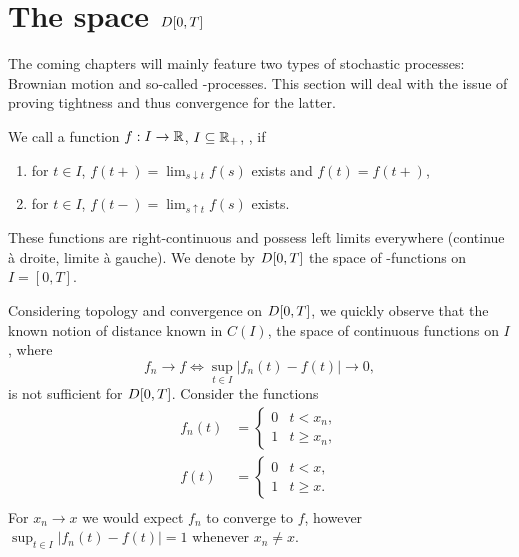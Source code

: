 \section{The space $D[0, T]$} \label{S: space DT}

The coming chapters will mainly feature two types of stochastic processes:
Brownian motion and so-called \cadlag-processes.
This section will deal with the issue of proving tightness and thus convergence for the latter.

\begin{definition} \label{D: DT}
	We call a function $f: I \rightarrow \mathbb{R}$, $I \subseteq \mathbb{R}_+$, \emph{\cadlag},
	if
	\begin{enumerate}
		\item for $t \in I$, $f(t+) = \lim_{s \downarrow t}f(s)$ exists and $f(t) = f(t+)$,
		\item for $t \in I$, $f(t-) = \lim_{s \uparrow t}f(s)$ exists.
	\end{enumerate}
	These functions are right-continuous and possess left limits everywhere (continue à droite, limite à gauche).
	We denote by $D[0, T]$ the space of \cadlag-functions on $I = [0,T]$.
\end{definition}

Considering topology and convergence on $D[0, T]$, 
we quickly observe that the known notion of distance known in $C(I)$,
the space of continuous functions on $I$,
where
\begin{equation}
	f_n \rightarrow f \iff \sup_{t \in I} |f_n(t) - f(t)| \rightarrow 0,
\end{equation}
is not sufficient for $D[0, T]$.
Consider the functions
\begin{equation}
	\begin{aligned}
	f_n(t) &= 
		\begin{cases} 
		0 & t < x_n, \\
		1 & t \geq x_n, 
		\end{cases} \\
	f(t) &= 
		\begin{cases} 
		0 & t < x, \\
		1 & t \geq x.
		\end{cases} \\
	\end{aligned}
\end{equation}
For $x_n \rightarrow x$ we would expect $f_n$ to converge to $f$,
however $\sup_{t \in I}|f_n(t) - f(t)| = 1$ whenever $x_n \neq x$.

